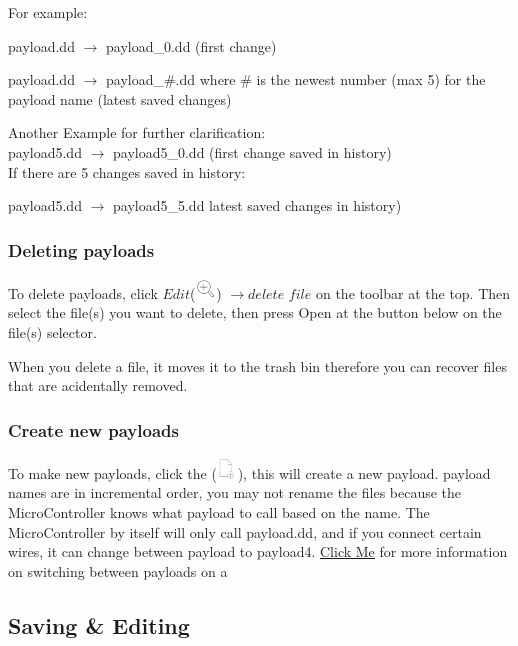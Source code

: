 \documentclass[a4paper,12pt]{article}
\begin{document}
For example:

payload.dd $\rightarrow$ payload\_0.dd (first change)

payload.dd $\rightarrow$ payload\_\#.dd where \# is the newest number (max 5) for the payload name (latest saved changes)

Another Example for further clarification:
\ \\
payload5.dd $\rightarrow$ payload5\_0.dd (first change saved in history)
\ \\
If there are 5 changes saved in history:

payload5.dd $\rightarrow$ payload5\_5.dd  latest saved changes in history)

\subsubsection{Deleting payloads}

To delete payloads, click $Edit$(\includegraphics[width=5.5mm]{pictures/black_bk/view.png}) $ \rightarrow delete$ $file$ on the toolbar at the top. Then select the file(s) you want to delete, then press Open at the button below on the file(s) selector.

When you delete a file, it moves it to the trash bin therefore you can recover files that are acidentally removed.

\subsubsection{Create new payloads}

To make new payloads, click the (\includegraphics[width=5.5mm]{pictures/black_bk/add_file.png}), this will create a new payload. payload names are in incremental order, you may not rename the files because the MicroController knows what payload to call based on the name. The MicroController by itself will only call payload.dd, and if you connect certain wires, it can change between payload to payload4. \href{https://github.com/dbisu/pico-ducky#multiple-payloads}{\underline{Click Me}} for more information on switching between payloads on a 

\subsection{Saving \& Editing}\label{save_edit}
\end{document}
